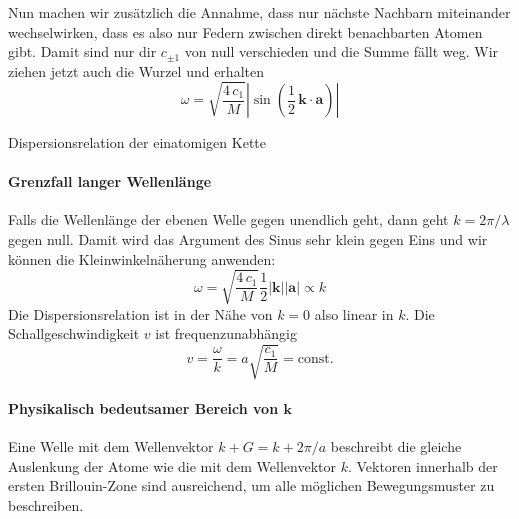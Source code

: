 Nun machen wir zusätzlich die Annahme, dass nur nächste Nachbarn miteinander wechselwirken, dass es also nur Federn zwischen direkt benachbarten Atomen gibt. Damit sind nur dir $c_{\pm 1}$ von null verschieden und die Summe fällt weg. Wir ziehen jetzt auch die Wurzel und erhalten
\begin{equation}
\omega = \sqrt{\frac{4 \, c_1}{M}} \left| \sin (\frac{1}{2} \, \mathbf{k} \cdot \mathbf{a}  ) \right| \label{eq:phonon_1atom}
\end{equation}

\begin{marginfigure}

\caption{Dispersionsrelation der einatomigen Kette}
\end{marginfigure}


\paragraph{Grenzfall langer Wellenlänge} Falls die Wellenlänge der ebenen Welle gegen unendlich geht, dann geht $k = 2 \pi / \lambda$  gegen null. Damit wird das Argument des Sinus sehr klein gegen Eins und wir können die Kleinwinkelnäherung anwenden:
\begin{equation}
\omega = \sqrt{\frac{4 \, c_1}{M}} \frac{1}{2}  |\mathbf{k}| | \mathbf{a}| \propto k
\end{equation}
Die Dispersionsrelation ist in der Nähe von $k = 0$ also linear in $k$. Die Schallgeschwindigkeit $v$ ist frequenzunabhängig
\begin{equation}
 v = \frac{\omega}{k} = a  \sqrt{\frac{ c_1}{M}}  = \text{const.}
\end{equation}



\paragraph{Physikalisch bedeutsamer Bereich von $\mathbf{k}$} 

\begin{marginfigure}

\caption{Eine Welle mit dem Wellenvektor $k + G = k + 2\pi /a$ beschreibt die gleiche Auslenkung der Atome wie die mit dem Wellenvektor $k$.  Vektoren innerhalb der ersten Brillouin-Zone sind ausreichend, um alle möglichen Bewegungsmuster zu beschreiben. \label{fig:phonon_k_plus_g} }
\end{marginfigure}


